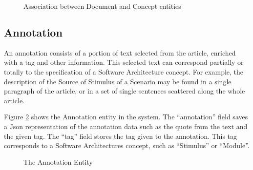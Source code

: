 \documentclass{llncs}
\begin{document}
\begin{figure}
\centering
\renewcommand {\umltextcolor}{black}
\renewcommand {\umlfillcolor}{none}
\renewcommand {\umldrawcolor}{black}

\caption{Association between Document and Concept entities}
\label{figure:documentConcept}
\end{figure}

\subsection{Annotation}
\label{section:annotation}

An annotation consists of a portion of text selected from the article, enriched with a tag and other information. This selected text can correspond partially or totally to the specification of a Software Architecture concept. For example, the description of the Source of Stimulus of a Scenario may be found in a single paragraph of the article, or in a set of single sentences scattered along the whole article. 

Figure \ref{figure:annotationEntity} shows the Annotation entity in the system. The ``annotation'' field saves a Json representation of the annotation data such as the quote from the text and the given tag. The ``tag'' field stores the tag given to the annotation. This tag corresponds to a Software Architectures concept, such as ``Stimulus'' or ``Module''.

\begin{figure}
\centering
\renewcommand {\umltextcolor}{black}
\renewcommand {\umlfillcolor}{none}
\renewcommand {\umldrawcolor}{black}

\caption{The Annotation Entity}
\label{figure:annotationEntity}
\end{figure}
\end{document}
